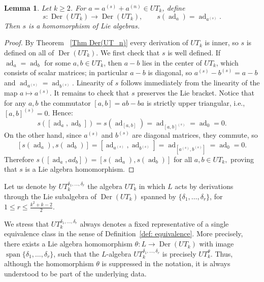 \documentclass[a4paper,reqno]{amsart}
\newtheorem{lemma}[theorem]{Lemma}
\theoremstyle{definition}
\numberwithin{equation}{section}
\numberwithin{theorem}{section}
\DeclareMathOperator{\spn}{span}
\DeclareMathOperator{\ad}{ad}
\DeclareMathOperator{\D}{Der}
\begin{document}
\begin{lemma}\label{diagonal-hom} Let $k \geq 2$. For $a = a^{(s)} + a^{(n)} \in UT_k$, define $$s: \D(UT_k) \longrightarrow \D(UT_k), \qquad s(\ad_a)=\ad_{a^{(s)}}.$$ Then $s$ is a homomorphism of Lie algebras.
\end{lemma}
\begin{proof} By Theorem ~\ref{Thm Der(UT_n)} every derivation of $UT_k$ is inner, so $s$ is defined on all of $\D(UT_k).$ We first check that $s$ is well defined.
If $\ad_a=\ad_b$ for some $a, b \in UT_k$,
then $a - b$ lies in the center of $UT_k$, which consists of scalar matrices; in particular $a-b$ is
diagonal, so $a^{(s)} - b^{(s)} = a - b$ and $\ad_{a^{(s)}}=\ad_{b^{(s)}}.$ Linearity of $s$ follows immediately from the linearity of the map $a \mapsto a^{(s)}$.
It remains to check that $s$ preserves the Lie bracket.  Notice that for any $a,b$ the commutator $[a,b] = ab - ba$ is strictly upper triangular, i.e., $[a,b]^{(s)}=0.$
Hence:
$$
s([\ad_a, \ad_b])=s(\ad_{[a,b]})=\ad_{[a,b]^{(s)}}=\ad_0=0.
$$
On the other hand, since $a^{(s)}$ and $b^{(s)}$ are diagonal matrices, they commute, so
$$
[s(\ad_a), s(\ad_b)]=[\ad_{a^{(s)}}, \ad_{b^{(s)}}]=\ad_{[a^{(s)}, b^{(s)}]}=\ad_0=0.
$$
Therefore
$
s([\ad_a, ad_b])=[s(\ad_a), s(\ad_b)]
$ 
for all $a, b \in UT_k,$
proving that $s$ is a Lie algebra homomorphism.
\end{proof}

Let us denote by $UT_k^{\delta_1, \ldots, \delta_r}$ the algebra $UT_k$ in which $L$ acts by derivations through the Lie subalgebra of $\D(UT_k)$ spanned by $\{\delta_1, \ldots, \delta_r\}$, for $1\leq r \leq \frac{k^2 + k -2}{2}$. 




We stress that $UT_k^{\delta_1,\ldots,\delta_r}$ always denotes a fixed representative of a single equivalence class in the sense of Definition~\eqref{def: equivalence}. More precisely, there exists a Lie algebra homomorphism $\theta:L\to\D(UT_k)$ with image
$\spn\{\delta_1,\ldots,\delta_r\}$, such that the $L$-algebra $UT_k^{\delta_1,\ldots,\delta_r}$ is precisely
$UT_k^\theta$. Thus, although the homomorphism $\theta$ is suppressed in the notation, it is always understood to be part of the underlying data. 
\end{document}

